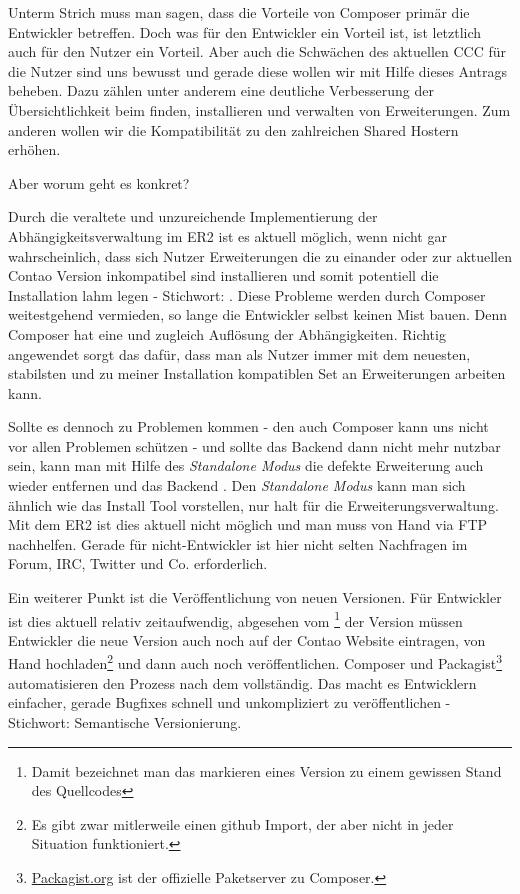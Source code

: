 \documentclass[
paper=a4,
draft=false,%
fontsize=10pt%
]{scrartcl}
\begin{document}
Unterm Strich muss man sagen, dass die Vorteile von Composer primär die Entwickler betreffen. Doch was für den Entwickler ein Vorteil ist, ist letztlich auch für den Nutzer ein Vorteil. Aber auch die Schwächen des aktuellen CCC für die Nutzer sind uns bewusst und gerade diese wollen wir mit Hilfe dieses Antrags beheben. Dazu zählen unter anderem eine deutliche Verbesserung der Übersichtlichkeit beim finden, installieren und verwalten von Erweiterungen. Zum anderen wollen wir die Kompatibilität zu den zahlreichen Shared Hostern erhöhen.

Aber worum geht es konkret?

Durch die veraltete und unzureichende Implementierung der Abhängigkeitsverwaltung im ER2 ist es aktuell möglich, wenn nicht gar wahrscheinlich, dass sich Nutzer Erweiterungen die zu einander oder zur aktuellen Contao Version inkompatibel sind installieren und somit potentiell die Installation lahm legen - Stichwort: . Diese Probleme werden durch Composer weitestgehend vermieden, so lange die Entwickler selbst keinen Mist bauen. Denn Composer hat eine  und zugleich  Auflösung der Abhängigkeiten. Richtig angewendet sorgt das dafür, dass man als Nutzer immer mit dem neuesten, stabilsten und zu meiner Installation kompatiblen Set an Erweiterungen arbeiten kann.

Sollte es dennoch zu Problemen kommen - den auch Composer kann uns nicht vor allen Problemen schützen - und sollte das Backend dann nicht mehr nutzbar sein, kann man mit Hilfe des \textit{Standalone Modus} die defekte Erweiterung auch wieder entfernen und das Backend . Den \textit{Standalone Modus} kann man sich ähnlich wie das Install Tool vorstellen, nur halt für die Erweiterungsverwaltung. Mit dem ER2 ist dies aktuell nicht möglich und man muss von Hand via FTP nachhelfen. Gerade für nicht-Entwickler ist hier nicht selten Nachfragen im Forum, IRC, Twitter und Co. erforderlich.

Ein weiterer Punkt ist die Veröffentlichung von neuen Versionen. Für Entwickler ist dies aktuell relativ zeitaufwendig, abgesehen vom \footnote{Damit bezeichnet man das markieren eines Version zu einem gewissen Stand des Quellcodes} der Version müssen Entwickler die neue Version auch noch auf der Contao Website eintragen, von Hand hochladen\footnote{Es gibt zwar mitlerweile einen github Import, der aber nicht in jeder Situation funktioniert.} und dann auch noch veröffentlichen. Composer und Packagist\footnote{\href{https://packagist.org}{Packagist.org} ist der offizielle Paketserver zu Composer.} automatisieren den Prozess nach dem  vollständig. Das macht es Entwicklern einfacher, gerade Bugfixes schnell und unkompliziert zu veröffentlichen - Stichwort: Semantische Versionierung.
\end{document}
